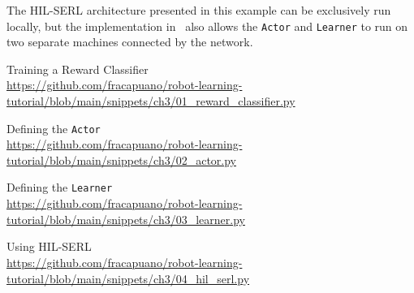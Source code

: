 The HIL-SERL architecture presented in this example can be exclusively run locally, but the implementation in \lerobot~also allows the \texttt{Actor} and \texttt{Learner} to run on two separate machines connected by the network.

\begin{pbox}[label={ex:train_reward_classifier}]{Training a Reward Classifier \\ \url{https://github.com/fracapuano/robot-learning-tutorial/blob/main/snippets/ch3/01_reward_classifier.py}}
    
\end{pbox}

\begin{pbox}[label={ex:hil_serl_defining_actor}]{Defining the \texttt{Actor} \\ \url{https://github.com/fracapuano/robot-learning-tutorial/blob/main/snippets/ch3/02_actor.py}}
    
\end{pbox}


\begin{pbox}[label={ex:hil_serl_defining_learner}]{Defining the \texttt{Learner} \\ \url{https://github.com/fracapuano/robot-learning-tutorial/blob/main/snippets/ch3/03_learner.py}}
    
\end{pbox}

\begin{pbox}[label={ex:hil_serl_full}]{Using HIL-SERL \\ \url{https://github.com/fracapuano/robot-learning-tutorial/blob/main/snippets/ch3/04_hil_serl.py}}
    
\end{pbox}


